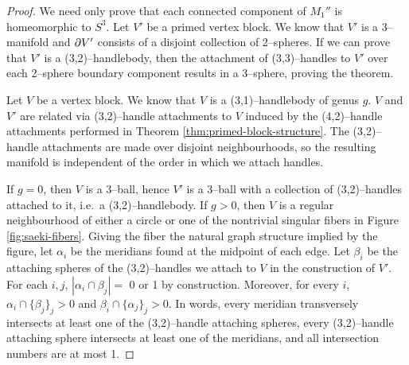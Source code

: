 \begin{proof}
	We need only prove that each connected component of $M_1''$ is homeomorphic to $S^3$.
	Let $V'$ be a primed vertex block.
	We know that $V'$ is a 3--manifold and $\partial V'$ consists of a disjoint collection of 2--spheres.
	If we can prove that $V'$ is a (3,2)--handlebody, then the attachment of (3,3)--handles to $V'$ over each 2--sphere boundary component results in a 3--sphere, proving the theorem.
	 
	Let $V$ be a vertex block.
	We know that $V$ is a (3,1)--handlebody of genus $g$.
	$V$ and $V'$ are related via (3,2)--handle attachments to $V$ induced by the (4,2)--handle attachments performed in Theorem \ref{thm:primed-block-structure}.
	The (3,2)--handle attachments are made over disjoint neighbourhoods, so the resulting manifold is independent of the order in which we attach handles.
	
	If $g=0$, then $V$ is a 3--ball, hence $V'$ is a 3--ball with a collection of (3,2)--handles attached to it, i.e.\ a (3,2)--handlebody.
	If $g>0$, then $V$ is a regular neighbourhood of either a circle or one of the nontrivial singular fibers in Figure \ref{fig:saeki-fibers}.
	Giving the fiber the natural graph structure implied by the figure, let $\alpha_i$ be the meridians found at the midpoint of each edge.
	Let $\beta_i$ be the attaching spheres of the (3,2)--handles we attach to $V$ in the construction of $V'$.
	For each $i,j$, $|\alpha_i\cap\beta_j|=$ 0 or 1 by construction.
	Moreover, for every $i$, $\alpha_i\cap\{\beta_j\}_j>0$ and $\beta_i\cap\{\alpha_j\}_j>0$.
	In words, every meridian transversely intersects at least one of the (3,2)--handle attaching spheres, every (3,2)--handle attaching sphere intersects at least one of the meridians, and all intersection numbers are at most 1.
	 


\end{proof}
